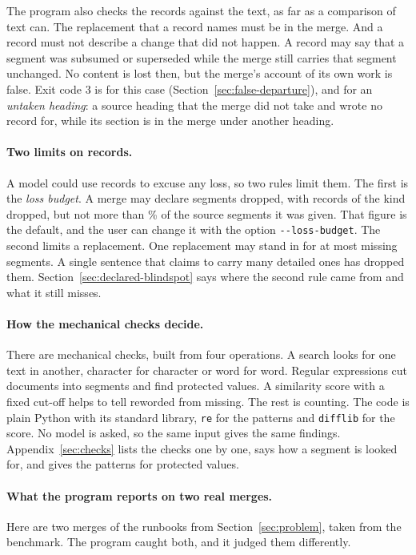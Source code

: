 The program also checks the records against the text, as far as a comparison of text can. The replacement that a record names must be in the merge. And a record must not describe a change that did not happen. A record may say that a segment was subsumed or superseded while the merge still carries that segment unchanged. No content is lost then, but the merge's account of its own work is false. Exit code 3 is for this case (Section~\ref{sec:false-departure}), and for an \emph{untaken heading}: a source heading that the merge did not take and wrote no record for, while its section is in the merge under another heading.

\paragraph{Two limits on records.} A model could use records to excuse any loss, so two rules limit them. The first is the \emph{loss budget}. A merge may declare segments dropped, with records of the kind dropped, but not more than \% of the source segments it was given. That figure is the default, and the user can change it with the option \texttt{-{}-loss-budget}. The second limits a replacement. One replacement may stand in for at most  missing segments. A single sentence that claims to carry many detailed ones has dropped them. Section~\ref{sec:declared-blindspot} says where the second rule came from and what it still misses.



\paragraph{How the mechanical checks decide.} There are  mechanical checks, built from four operations. A search looks for one text in another, character for character or word for word. Regular expressions cut documents into segments and find protected values. A similarity score with a fixed cut-off helps to tell reworded from missing. The rest is counting. The code is plain Python with its standard library, \texttt{re} for the patterns and \texttt{difflib} for the score. No model is asked, so the same input gives the same findings. Appendix~\ref{sec:checks} lists the checks one by one, says how a segment is looked for, and gives the patterns for protected values.
\paragraph{What the program reports on two real merges.} Here are two merges of the runbooks from Section~\ref{sec:problem}, taken from the benchmark. The program caught both, and it judged them differently.

